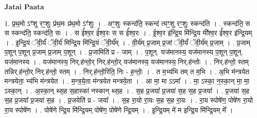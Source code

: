 \documentclass[17pt]{extarticle}
\begin{document}
\textbf{Jatai Paata} \newline

1. प्र॒थ॒मो ऽꣳ॑शु रꣳ॒॒शुः प्र॑थ॒मः प्र॑थ॒मो ऽꣳ॑शुः । . अꣳ॒॒शुः स्कन्द॑ति॒ स्कन्द॑ त्यꣳ॒॒शु रꣳ॒॒शुः स्कन्द॑ति । . स्कन्द॑ति॒ स स स्कन्द॑ति॒ स्कन्द॑ति॒ सः । . स ई᳚श्व॒र ई᳚श्व॒रः स स ई᳚श्व॒रः । . ई॒श्व॒र इ॑न्द्रि॒य मि॑न्द्रि॒य मी᳚श्व॒र ई᳚श्व॒र इ॑न्द्रि॒यम् । . इ॒न्द्रि॒यं ॅवी॒र्यं॑ ॅवी॒र्य॑ मिन्द्रि॒य मि॑न्द्रि॒यं ॅवी॒र्य᳚म् । . वी॒र्य॑म् प्र॒जाम् प्र॒जां ॅवी॒र्यं॑ ॅवी॒र्य॑म् प्र॒जाम् । . प्र॒जाम् प॒शून् प॒शून् प्र॒जाम् प्र॒जाम् प॒शून् । . प्र॒जामिति॑ प्र - जाम् । . प॒शून्. यज॑मानस्य॒ यज॑मानस्य प॒शून् प॒शून्. यज॑मानस्य । . यज॑मानस्य॒ निर्.ह॑न्तो॒र् निर्.ह॑न्तो॒र् यज॑मानस्य॒ यज॑मानस्य॒ निर्.ह॑न्तोः । . निर्.ह॑न्तो॒ स्तम् तन्निर्.ह॑न्तो॒र् निर्.ह॑न्तो॒ स्तम् । . निर्.ह॑न्तो॒रिति॒ निः - ह॒न्तोः॒ । . त म॒भ्य॑भि तम् त म॒भि । . अ॒भि म॑न्त्रयेत मन्त्रयेता॒ भ्य॑भि म॑न्त्रयेत । . म॒न्त्र॒ये॒ता म॑न्त्रयेत मन्त्रये॒ता । . आ मा॒ मा ऽऽमा᳚ । . मा॒ ऽस्का॒ न॒स्का॒न् मा॒ मा॒ ऽस्का॒न् । . अ॒स्का॒न् थ्स॒ह स॒हास्का॑ नस्कान् थ्स॒ह । . स॒ह प्र॒जया᳚ प्र॒जया॑ स॒ह स॒ह प्र॒जया᳚ । . प्र॒जया॑ स॒ह स॒ह प्र॒जया᳚ प्र॒जया॑ स॒ह । . प्र॒जयेति॑ प्र - जया᳚ । . स॒ह रा॒यो रा॒यः स॒ह स॒ह रा॒यः । . रा॒य स्पोषे॑ण॒ पोषे॑ण रा॒यो रा॒य स्पोषे॑ण । . पोषे॑णे न्द्रि॒य मि॑न्द्रि॒यम् पोषे॑ण॒ पोषे॑णे न्द्रि॒यम् । . इ॒न्द्रि॒यम् मे॑ म इन्द्रि॒य मि॑न्द्रि॒यम् मे᳚ । \newline
\end{document}
